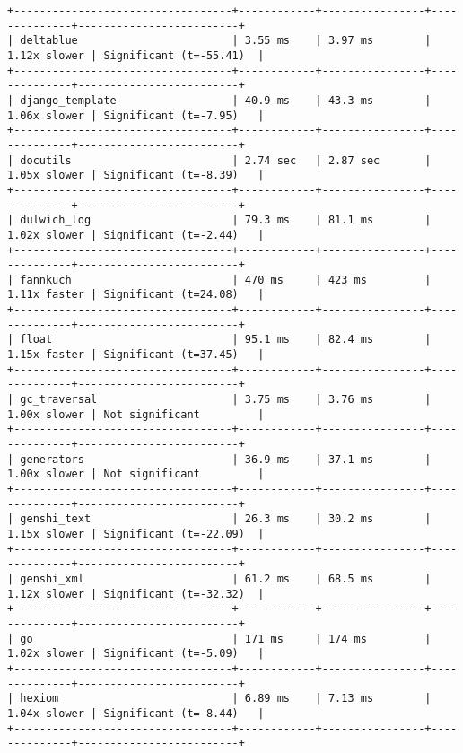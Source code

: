 \begin{code}
\begin{verbatim}
+----------------------------------+------------+----------------+--------------+-------------------------+
| deltablue                        | 3.55 ms    | 3.97 ms        | 1.12x slower | Significant (t=-55.41)  |
+----------------------------------+------------+----------------+--------------+-------------------------+
| django_template                  | 40.9 ms    | 43.3 ms        | 1.06x slower | Significant (t=-7.95)   |
+----------------------------------+------------+----------------+--------------+-------------------------+
| docutils                         | 2.74 sec   | 2.87 sec       | 1.05x slower | Significant (t=-8.39)   |
+----------------------------------+------------+----------------+--------------+-------------------------+
| dulwich_log                      | 79.3 ms    | 81.1 ms        | 1.02x slower | Significant (t=-2.44)   |
+----------------------------------+------------+----------------+--------------+-------------------------+
| fannkuch                         | 470 ms     | 423 ms         | 1.11x faster | Significant (t=24.08)   |
+----------------------------------+------------+----------------+--------------+-------------------------+
| float                            | 95.1 ms    | 82.4 ms        | 1.15x faster | Significant (t=37.45)   |
+----------------------------------+------------+----------------+--------------+-------------------------+
| gc_traversal                     | 3.75 ms    | 3.76 ms        | 1.00x slower | Not significant         |
+----------------------------------+------------+----------------+--------------+-------------------------+
| generators                       | 36.9 ms    | 37.1 ms        | 1.00x slower | Not significant         |
+----------------------------------+------------+----------------+--------------+-------------------------+
| genshi_text                      | 26.3 ms    | 30.2 ms        | 1.15x slower | Significant (t=-22.09)  |
+----------------------------------+------------+----------------+--------------+-------------------------+
| genshi_xml                       | 61.2 ms    | 68.5 ms        | 1.12x slower | Significant (t=-32.32)  |
+----------------------------------+------------+----------------+--------------+-------------------------+
| go                               | 171 ms     | 174 ms         | 1.02x slower | Significant (t=-5.09)   |
+----------------------------------+------------+----------------+--------------+-------------------------+
| hexiom                           | 6.89 ms    | 7.13 ms        | 1.04x slower | Significant (t=-8.44)   |
+----------------------------------+------------+----------------+--------------+-------------------------+

\end{verbatim}
\end{code}
